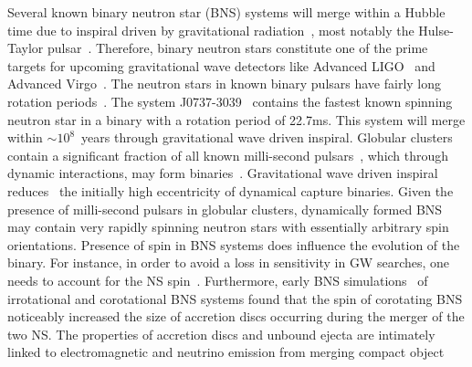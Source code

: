 Several known binary neutron star (BNS) systems  will merge within a
Hubble time due to inspiral driven by gravitational
radiation~\cite{Lorimer2008}, most notably the Hulse-Taylor
pulsar~\cite{Hulse:1975uf}.  Therefore, binary neutron stars
constitute one of the prime targets for upcoming gravitational wave
detectors like Advanced LIGO~\cite{aLIGO1,aLIGO2} and Advanced
Virgo~\cite{AdV,TheVirgo:2014hva}.
The neutron stars in known binary pulsars have fairly long rotation
periods~\cite{Lorimer2008}.  The system J0737-3039~\cite{Lyne:2004cj}
contains the fastest known spinning neutron star in a binary with a
rotation period of 22.7ms.  This system will merge within $\sim
10^8$~years through gravitational wave driven inspiral. Globular
clusters contain a significant fraction of all known milli-second
pulsars~\cite{Lorimer2008}, which through dynamic interactions, may
form binaries~\cite{2010ApJ...720..953L,Benacquista:2011kv}. Gravitational wave driven
inspiral reduces~\cite{PetersMathews1963,Peters1964} the initially
high eccentricity of dynamical capture binaries.
Given the presence of milli-second pulsars in
globular clusters, dynamically formed BNS may contain very rapidly
spinning neutron stars with essentially arbitrary spin orientations.
Presence of spin in BNS systems does influence the evolution of the
binary.  For instance, in order to avoid a loss in sensitivity in GW
searches, one needs to account for the NS spin~\cite{Brown:2012qf}.
Furthermore, early BNS simulations~\cite{Shibata00b} of irrotational
and corotational BNS systems found that the spin
of corotating BNS noticeably increased the size of accretion discs
occurring during the merger of the two NS.  The properties of
accretion discs and unbound ejecta are intimately linked to
electromagnetic and neutrino emission from merging compact object
